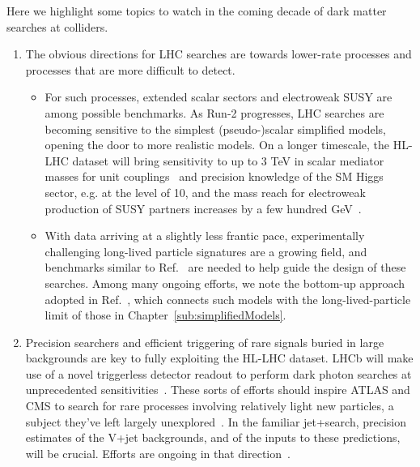 Here we highlight some topics to watch in the coming decade of dark matter searches at colliders.

\begin{issues}
\begin{enumerate}

\item The obvious directions for LHC searches are towards lower-rate processes and processes that are more difficult to detect.

\begin{itemize} 

\item For such processes, extended scalar sectors and electroweak SUSY are among possible benchmarks. As Run-2 progresses, LHC searches are becoming sensitive to the simplest (pseudo-)scalar simplified models, opening the door to more realistic models.
On a longer timescale, the HL-LHC dataset will bring sensitivity to up to 3 TeV in scalar mediator masses for unit couplings~\cite{CMS-PAS-FTR-16-005} and precision knowledge of the SM Higgs sector, e.g. at the level of 10, and the mass reach for electroweak production of SUSY partners increases by a few hundred GeV~\cite{Campana:2016cqm}.

\item With data arriving at a slightly less frantic pace, experimentally challenging long-lived particle signatures are a growing field, and benchmarks similar to Ref.~\cite{Abercrombie:2015wmb} are needed to help guide the design of these searches. Among many ongoing efforts, we note the bottom-up approach adopted in Ref.~\cite{Buchmueller:2017uqu}, which connects such models with the long-lived-particle limit of those in Chapter~\ref{sub:simplifiedModels}. 

\end{itemize} 

\item Precision searchers and efficient triggering of rare signals buried in large backgrounds are key to fully exploiting the HL-LHC dataset.
  LHCb will make use of a novel triggerless detector readout to perform dark photon searches at unprecedented sensitivities~\cite{Ilten:2016tkc}.
  These sorts of efforts should inspire ATLAS and CMS to search for rare processes involving relatively light new particles, a subject they've left largely unexplored~\cite{Alves:2016cqf}.
  In the familiar jet+\MET search, precision estimates of the V+jet backgrounds, and of the inputs to these predictions, will be crucial. Efforts are ongoing in that direction~\cite{Blumenschein:2018gtm}. 


\end{enumerate}
\end{issues}
